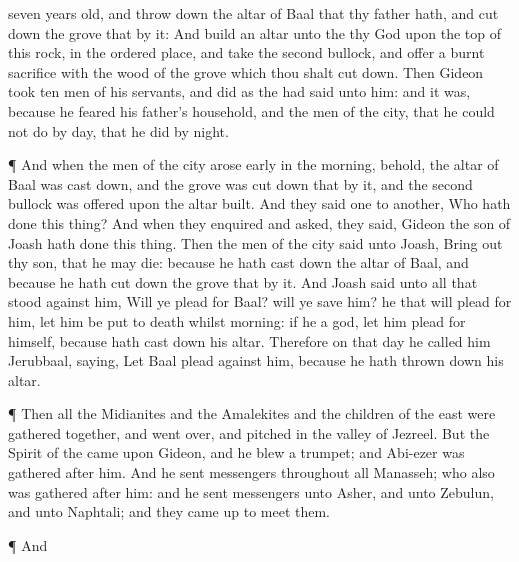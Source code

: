 {seven years
old, and throw
down the
altar of
Baal that thy
father hath, and cut
down the
grove that
{} by it:
And
build an
altar unto the
{} thy
God upon the
top of this
rock, in the ordered
place, and
take the
second
bullock, and
offer a burnt
sacrifice with the
wood of the
grove which thou shalt cut
down.
Then
Gideon
took
ten
men of his
servants, and
did as the
{} had
said unto him: and
{} it was, because he
feared his
father’s
household, and the
men of the
city, that he could not
do
{} by
day, that he
did
{} by
night.
\par }{\PP {}¶ And when the
men of the
city arose
early in the
morning, behold, the
altar of
Baal was cast
down, and the
grove was cut
down that
{} by it, and the
second
bullock was
offered upon the
altar
{}
built.
And they
said
one to
another, Who hath
done this
thing? And when they
enquired and
asked, they
said,
Gideon the
son of
Joash hath
done this
thing.
Then the
men of the
city
said unto
Joash, Bring
out thy
son, that he may
die: because he hath cast
down the
altar of
Baal, and because he hath cut
down the
grove that
{} by it.
And
Joash
said unto all that
stood against him, Will ye
plead for
Baal? will ye
save him? he that will
plead for him, let him be put to
death whilst
{}
morning: if he
{} a
god, let him
plead for himself, because
{} hath cast
down his
altar.
Therefore on that
day he
called him
Jerubbaal,
saying, Let
Baal
plead against him, because he hath thrown
down his
altar.
\par }{\PP {}¶ Then all the
Midianites and the
Amalekites and the
children of the
east were
gathered
together, and went
over, and
pitched in the
valley of
Jezreel.
But the
Spirit of the
{}
came upon
Gideon, and he
blew a
trumpet; and
Abi-ezer was
gathered
after him.
And he
sent
messengers throughout all
Manasseh; who also was
gathered
after him: and he
sent
messengers unto
Asher, and unto
Zebulun, and unto
Naphtali; and they came
up to
meet them.
\par }{\PP {}¶ And
}

